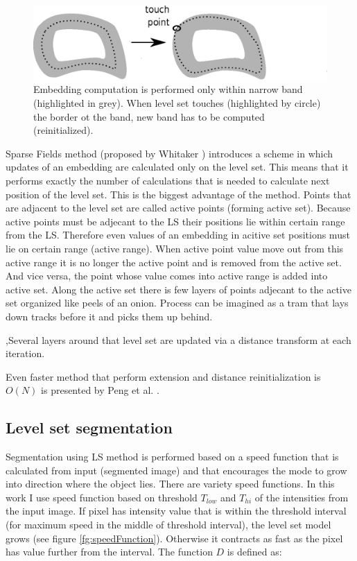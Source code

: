 \begin{figure}
    \centering
    \includegraphics[width=14cm]{data/narrowBands.eps}
    \caption[Narrow bands computation illustration]{Embedding computation is performed only within narrow band (highlighted in grey). When level set touches (highlighted by circle) the border ot the band, new band has to be computed (reinitialized).}
    \label{fg:narrowBands}
\end{figure}

Sparse Fields method (proposed by Whitaker \cite{sparseFilelds}) introduces a scheme in which updates of an embedding are calculated only on the level set. This means that it performs exactly the number of calculations that is needed to calculate next position of the level set. This is the biggest advantage of the method. Points that are adjacent to the level set are called active points (forming active set). Because active points must be adjecant to the LS their positions lie within certain range from the LS. Therefore even values of an embedding in acitive set positions must lie on certain range (active range). When active point value move out from this active range it is no longer the active point and is removed from the active set. And vice versa, the point whose value comes into active range is added into active set. Along the active set there is few layers of points adjecant to the active set organized like peels of an onion. 
Process can be imagined as a tram that lays down tracks before it and picks them up behind.

,Several layers around that level set are updated via a distance transform at each iteration.

Even faster method that perform extension and distance reinitialization is $O(N)$ is presented by Peng et al. \cite{pengSparseFields}.

\subsection{Level set segmentation}

Segmentation using LS method is performed based on a speed function that is calculated from input (segmented image) and that encourages the mode to grow into direction where the object lies. There are variety speed functions. In this work I use speed function based on threshold $T_{low}$ and $T_{hi}$ of the intensities from the input image. If pixel has intensity value that is within the threshold interval (for maximum speed in the middle of threshold interval), the level set model grows (see figure \ref{fg:speedFunction}). Otherwise it contracts as fast as the pixel has value further from the interval. The function $D$ is defined as:

